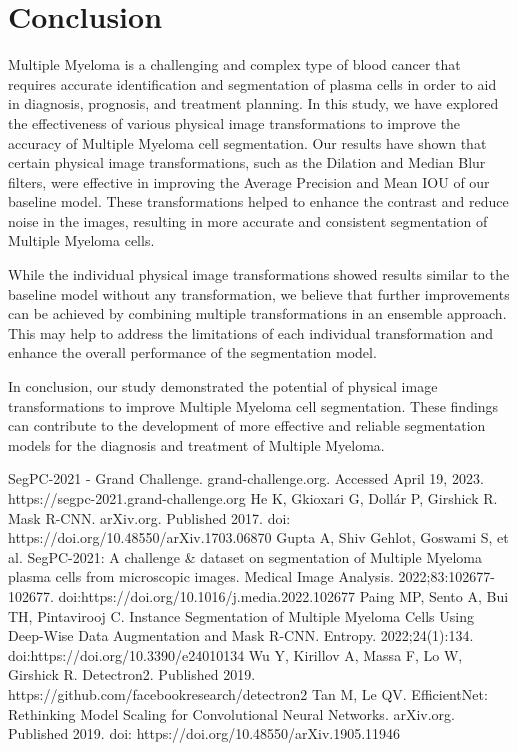 \documentclass{article}
\begin{document}
\section{Conclusion}

Multiple Myeloma is a challenging and complex type of blood cancer that requires accurate identification and segmentation of plasma cells in order to aid in diagnosis, prognosis, and treatment planning. In this study, we have explored the effectiveness of various physical image transformations to improve the accuracy of Multiple Myeloma cell segmentation. Our results have shown that certain physical image transformations, such as the Dilation and Median Blur filters, were effective in improving the Average Precision and Mean IOU of our baseline model. These transformations helped to enhance the contrast and reduce noise in the images, resulting in more accurate and consistent segmentation of Multiple Myeloma cells.

While the individual physical image transformations showed results similar to the baseline model without any transformation, we believe that further improvements can be achieved by combining multiple transformations in an ensemble approach. This may help to address the limitations of each individual transformation and enhance the overall performance of the segmentation model.

In conclusion, our study demonstrated the potential of physical image transformations to improve Multiple Myeloma cell segmentation. These findings can contribute to the development of more effective and reliable segmentation models for the diagnosis and treatment of Multiple Myeloma.

\begin{thebibliography}{99}

  \bibitem{} SegPC-2021 - Grand Challenge. grand-challenge.org. Accessed April 19, 2023. https://segpc-2021.grand-challenge.org
  \bibitem{} He K, Gkioxari G, Dollár P, Girshick R. Mask R-CNN. arXiv.org. Published 2017. doi: https://doi.org/10.48550/arXiv.1703.06870
  \bibitem{} Gupta A, Shiv Gehlot, Goswami S, et al. SegPC-2021: A challenge \& dataset on segmentation of Multiple Myeloma plasma cells from microscopic images. Medical Image Analysis. 2022;83:102677-102677. doi:https://doi.org/10.1016/j.media.2022.102677
  \bibitem{} Paing MP, Sento A, Bui TH, Pintavirooj C. Instance Segmentation of Multiple Myeloma Cells Using Deep-Wise Data Augmentation and Mask R-CNN. Entropy. 2022;24(1):134. doi:https://doi.org/10.3390/e24010134
  \bibitem{} Wu Y, Kirillov A, Massa F, Lo W, Girshick R. Detectron2. Published 2019. https://github.com/facebookresearch/detectron2
  \bibitem{} Tan M, Le QV. EfficientNet: Rethinking Model Scaling for Convolutional Neural Networks. arXiv.org. Published 2019. doi: https://doi.org/10.48550/arXiv.1905.11946
  
\end{thebibliography}
\end{document}
